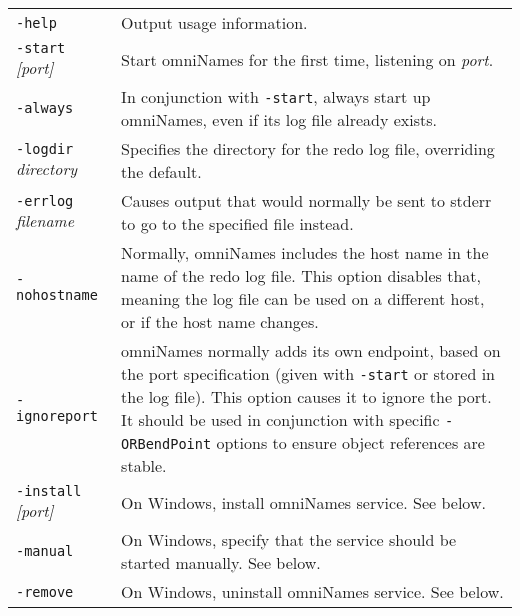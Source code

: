\documentclass[draft,a4paper,11pt,twoside]{article}
\newcommand{\cmdline}[1]{\texttt{#1}}
\begin{document}
\begin{tabular}{lp{}}

\cmdline{-help} &
    Output usage information.\\[.5\baselineskip]

\cmdline{-start }\textit{[port]} &
    Start omniNames for the first time, listening on
    \textit{port}.\\[.5\baselineskip]

\cmdline{-always} &
    In conjunction with \cmdline{-start}, always start up
    omniNames, even if its log file already exists.\\[.5\baselineskip]

\cmdline{-logdir }\textit{directory} &
    Specifies the directory for the redo log file, overriding the
    default.\\[.5\baselineskip]

\cmdline{-errlog }\textit{filename} &
    Causes output that would normally be sent to stderr to go to the
    specified file instead.\\[.5\baselineskip]

\cmdline{-nohostname} &
    Normally, omniNames includes the host name in the name of the redo
    log file. This option disables that, meaning the log file can be
    used on a different host, or if the host name
    changes.\\[.5\baselineskip]

\cmdline{-ignoreport} &
    omniNames normally adds its own endpoint, based on the port
    specification (given with \cmdline{-start} or stored in the log
    file). This option causes it to ignore the port. It should be used
    in conjunction with specific \cmdline{-ORBendPoint} options to
    ensure object references are stable.\\[.5\baselineskip]

\cmdline{-install }\textit{[port]} &
    On Windows, install omniNames service. See below.\\[.5\baselineskip]

\cmdline{-manual} &
    On Windows, specify that the service should be started
    manually. See below.\\[.5\baselineskip]

\cmdline{-remove} &
    On Windows, uninstall omniNames service. See below.\\[.5\baselineskip]

\end{tabular}
\end{document}
